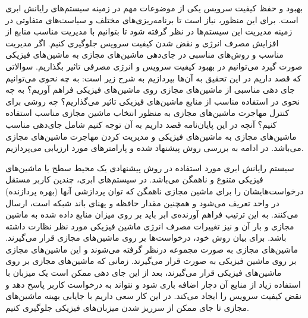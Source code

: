 \label{فصل‌پیشنهاد}
 بهبود و حفظ کیفیت سرویس یکی از موضوعات مهم در زمینه سیستم‌های رایانش ابری است. برای این منظور، نیاز است تا برنامه‌ریزی‌های مختلف و سیاست‌های متفاوتی در زمینه مدیریت این سیستم‌ها در نظر گرفته شود تا بتوانیم با مدیریت مناسب منابع از افزایش مصرف انرژی  و نقض شدن کیفیت سرویس جلوگیری کنیم. اگر مدیریت مناسب و روش‌های مناسبی در جای‌دهی ماشین‌های مجازی به ماشین‌های فیزیکی صورت گیرد می‌توانیم در بهبود کیفیت سرویس و انرژی مصرفی تاثیر بگذاریم. سوالاتی که قصد داریم  در این تحقیق به آن‌ها بپردازیم به شرح زیر است:
 به چه نحوی می‌توانیم جای دهی مناسبی از ماشین‌های مجازی روی ماشین‌های فیزیکی فراهم آوریم؟
 به چه نحوی در استفاده مناسب از منابع ماشین‌های فیزیکی تاثیر می‌گذاریم؟
 چه روشی برای کنترل مهاجرت ماشین‌های مجازی به منظور انتخاب ماشین مجازی مناسب استفاده کنیم؟
آنچه در این پایان‌نامه قصد داریم به آن توجه کنیم شامل جای‌دهی مناسب ماشین‌های مجازی به ماشین‌های فیزیکی و مدیریت کردن مهاجرت ماشین‌های مجازی می‌باشد. 
در ادامه به بررسی روش پیشنهاد شده و پارامتر‌های مورد ارزیابی می‌پردازیم.

سیستم رایانش ابری مورد استفاده در روش پیشنهادی یک محیط سطح
 با ماشین‌های فیزیکی متنوع و ناهمگن می‌باشد. در سیستم‌های ابری، چندین کاربر مستقل درخواست‌هایشان را برای
  ماشین مجازی ناهمگن که توان پردازشی آنها (بهره پردازنده) در واحد
    تعریف می‌شود و همچنین مقدار حافظه و پهنای باند شبکه است، ارسال می‌کنند. به این ترتیب فراهم آورنده‌ی ابر باید بر روی میزان منابع داده شده به ماشین مجازی و بار آن و نیز تغییرات مصرف انرژی ماشین فیزیکی مورد نظر نظارت داشته باشد. 
برای بیان روش خود، درخواست‌ها بر روی ماشین‌های مجازی قرار می‌گیرند. ماشین‌های مجازی به صورت مجموعه
 درنظر گرفته می‌شوند و این ماشین‌های مجازی بر روی 
 ماشین فیزیکی به صورت 
  قرار می‌گیرند. زمانی که ماشین‌های مجازی بر روی ماشین‌های فیزیکی قرار می‌گیرند، بعد از این جای دهی ممکن است یک میزبان با استفاده زیاد از منابع آن دچار اضافه باری شود و نتواند به درخواست کاربر پاسخ دهد و نقض کیفیت سرویس را ایجاد می‌کند. در این کار سعی داریم با جایابی بهینه ماشین‌های مجازی تا جای ممکن از سرریز شدن میزبان‌های فیزیکی جلوگیری کنیم.
  
